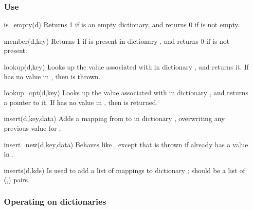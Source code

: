 \subsubsection*{Use}

\begin{defun}{is_empty}{(d)}
Returns 1 if  is an empty dictionary, and returns 0 if  is
not empty.
\end{defun}

\begin{defun}{member}{(d,key)}
Returns 1 if  is present in dictionary , and returns 0
if  is not present.
\end{defun}

\begin{defun}{lookup}{(d,key)}
Looks up the value associated with  in dictionary , and
returns it.  If  has no value in , then  is
thrown.
\end{defun}

\begin{defun}{lookup_opt}{(d,key)}
Looks up the value associated with  in dictionary , and
returns a pointer to it.  If  has no value in , then
 is returned.
\end{defun}

\begin{defun}{insert}{(d,key,data)}
Adds a mapping from  to  in dictionary ,
overwriting any previous value for .
\end{defun}

\begin{defun}{insert_new}{(d,key,data)}
Behaves like , except that  is thrown if
 already has a value in .
\end{defun}

\begin{defun}{inserts}{(d,kds)}
Is used to add a list of mappings to dictionary ; 
should be a list of (,) pairs.
\end{defun}

\subsubsection*{Operating on dictionaries}

